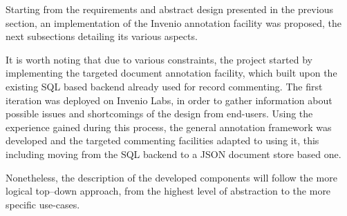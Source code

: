 
Starting from the requirements and abstract design presented in the previous
section, an implementation of the Invenio annotation facility was proposed,
the next subsections detailing its various aspects.

It is worth noting that due to various constraints, the project started by
implementing the targeted document annotation facility, which built upon the
existing SQL based backend already used for record commenting. The first
iteration was deployed on Invenio Labs, in order to gather information about
possible issues and shortcomings of the design from end-users. Using the
experience gained during this process, the general annotation framework was
developed and the targeted commenting facilities adapted to using it, this
including moving from the SQL backend to a JSON document store based one.

Nonetheless, the description of the developed components will follow the more
logical top--down approach, from the highest level of abstraction to the more
specific use-cases.
